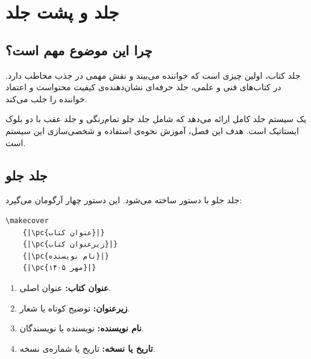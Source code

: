 
\chapter{جلد و پشت جلد}
\label{chap:cover}

\section{چرا این موضوع مهم است؟}
\label{sec:cover-why}

جلد کتاب، اولین چیزی است که خواننده می‌بیند و
نقش مهمی در جذب مخاطب دارد. در کتاب‌های فنی و
علمی، جلد حرفه‌ای نشان‌دهنده‌ی کیفیت محتواست و
اعتماد خواننده را جلب می‌کند.

 یک سیستم جلد کامل ارائه می‌دهد که
شامل جلد جلو تمام‌رنگی و جلد عقب با دو بلوک
ایستاتیک است. هدف این فصل، آموزش نحوه‌ی استفاده
و شخصی‌سازی این سیستم است.


\section{جلد جلو}
\label{sec:cover-front}

جلد جلو با دستور  ساخته می‌شود.
این دستور چهار آرگومان می‌گیرد:

\begin{latin}
\begin{verbatim}
\makecover
    {|\pc{عنوان کتاب}|}
    {|\pc{زیرعنوان کتاب}|}
    {|\pc{نام نویسنده}|}
    {|\pc{مهر ۱۴۰۵}|}
\end{verbatim}
\end{latin}

\begin{enumerate}
    \item \textbf{عنوان کتاب:} عنوان اصلی.
    \item \textbf{زیرعنوان:} توضیح کوتاه یا شعار.
    \item \textbf{نام نویسنده:} نویسنده یا نویسندگان.
    \item \textbf{تاریخ یا نسخه:} تاریخ یا شماره‌ی نسخه.
\end{enumerate}


